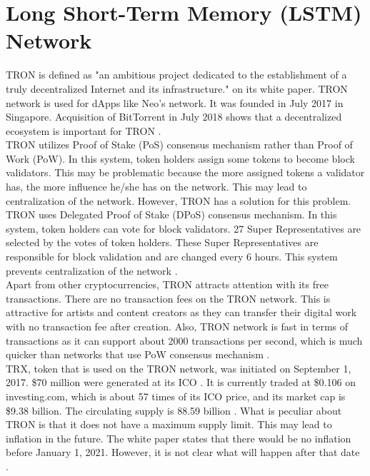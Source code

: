 \documentclass[12pt, a4paper]{article}
\begin{document}
\section{Long Short-Term Memory (LSTM) Network}
TRON is defined as "an ambitious project dedicated to the establishment of a truly decentralized Internet and its infrastructure." on its white paper.  TRON network is used for dApps like Neo's network.  It was founded in July 2017 in Singapore.  Acquisition of BitTorrent in July 2018 shows that a decentralized ecosystem is important for TRON \cite{7}.\\[\baselineskip]
TRON utilizes Proof of Stake (PoS) consensus mechanism rather than Proof of Work (PoW).  In this system, token holders assign some tokens to become block validators.  This may be problematic because the more assigned tokens a validator has, the more influence he/she has on the network.  This may lead to centralization of the network.  However, TRON has a solution for this problem.  TRON uses Delegated Proof of Stake (DPoS) consensus mechanism.  In this system, token holders can vote for block validators.  27 Super Representatives are selected by the votes of token holders.  These Super Representatives are responsible for block validation and are changed every 6 hours.  This system prevents centralization of the network \cite{7}.\\[\baselineskip]
Apart from other cryptocurrencies, TRON attracts attention with its free transactions.  There are no transaction fees on the TRON network.  This is attractive for artists and content creators as they can transfer their digital work with no transaction fee after creation.  Also, TRON network is fast in terms of transactions as it can support about 2000 transactions per second, which is much quicker than networks that use PoW consensus mechanism \cite{8}.\\[\baselineskip]
TRX, token that is used on the TRON network, was initiated on September 1, 2017.  \$70 million were generated at its ICO \cite{9}.  It is currently traded at \$0.106 on investing.com, which is about 57 times of its ICO price, and its market cap is \$9.38 billion.  The circulating supply is 88.59 billion \cite{10}.  What is peculiar about TRON is that it does not have a maximum supply limit.  This may lead to inflation in the future.  The white paper states that there would be no inflation before January 1, 2021.  However, it is not clear what will happen after that date \cite{7}.\\
\end{document}
